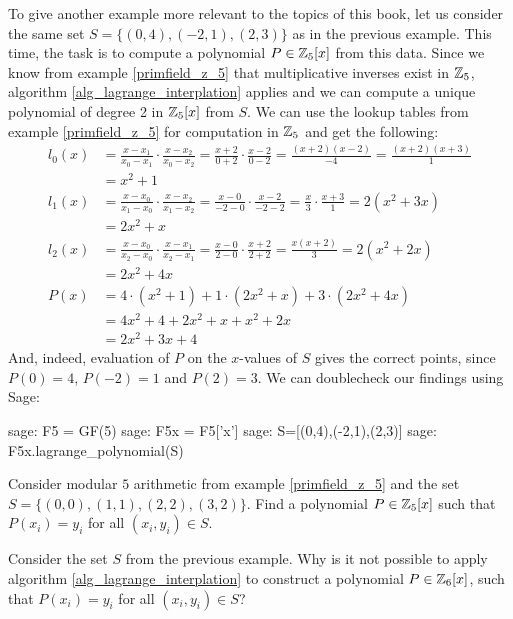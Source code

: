 \begin{example} To give another example more relevant to the topics of this book, let us consider the same set $S=\{(0,4),(-2,1),(2,3)\}$ as in the previous example. This time, the task is to compute a polynomial $P\in\mathbb{Z}_5[x]$ from this data. Since we know
from example \ref{primfield_z_5} that multiplicative inverses exist in $\mathbb{Z}_5$, algorithm \ref{alg_lagrange_interplation} applies and we can compute a unique polynomial of degree 2 in $\mathbb{Z}_5[x]$ from $S$. We can use the lookup tables from example \ref{primfield_z_5} for computation in $\mathbb{Z}_5$ and get the following:
\begin{align*}
l_0(x) & = \frac{x-x_1}{x_0-x_1}\cdot\frac{x-x_2}{x_0-x_2}
         = \frac{x+2}{0+2}\cdot\frac{x-2}{0-2}
         =  \frac{(x+2)(x-2)}{-4}
         =  \frac{(x+2)(x+3)}{1}\\
       & =  x^2+1\\
l_1(x) & =  \frac{x-x_0}{x_1-x_0}\cdot\frac{x-x_2}{x_1-x_2}
         = \frac{x-0}{-2-0}\cdot \frac{x-2}{-2-2}
         = \frac{x}{3}\cdot \frac{x+3}{1}
         = 2(x^2+3x)\\
       & =  2x^2+x\\
l_2(x) & = \frac{x-x_0}{x_2-x_0}\cdot\frac{x-x_1}{x_2-x_1}
         = \frac{x-0}{2-0}\cdot\frac{x+2}{2+2}
         = \frac{x(x+2)}{3}
         = 2(x^2+2x)\\
       & = 2x^2+4x\\
P(x)   & = 4\cdot (x^2+1) + 1\cdot (2x^2+x) + 3\cdot (2x^2+4x) \\
       & = 4x^2+4 + 2x^2 +x + x^2+2x\\
       & = 2x^2 +3x +4
\end{align*}
And, indeed, evaluation of $P$ on the $x$-values of $S$ gives the correct points, since $P(0)=4$, $P(-2)=1$ and $P(2)=3$. We can doublecheck our findings using Sage:
\begin{sagecommandline}sage: F5 = GF(5)
sage: F5x = F5['x']
sage: S=[(0,4),(-2,1),(2,3)]
sage: F5x.lagrange_polynomial(S)
\end{sagecommandline}
\end{example}
\begin{exercise}
Consider modular $5$ arithmetic from example \ref{primfield_z_5} and the set
$S=\{(0,0),(1,1),(2,2),(3,2)\}$. Find a polynomial $P\in\mathbb{Z}_5[x]$ such that $P(x_i)=y_i$ for all $(x_i,y_i)\in S$.
\end{exercise}
\begin{exercise}
Consider the set $S$ from the previous example. Why is it not possible to apply algorithm \ref{alg_lagrange_interplation} to construct a polynomial $P\in \mathbb{Z}_6[x]$,  such that $P(x_i)=y_i$ for all $(x_i,y_i)\in S$?
\end{exercise}
